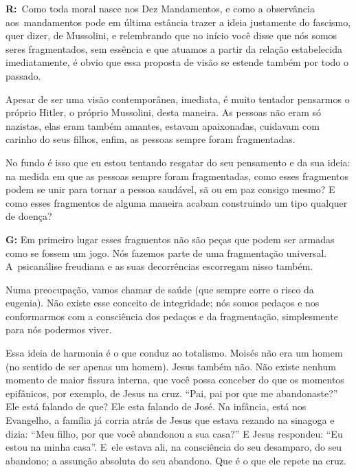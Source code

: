  

\textbf{R:}~Como toda moral nasce nos Dez Mandamentos, e como a
observância aos\textbf{}~mandamentos pode em última estância trazer a
ideia justamente do fascismo, quer dizer, de Mussolini, e relembrando
que no início você disse que nós somos seres fragmentados, sem essência
e que atuamos a partir da relação estabelecida imediatamente, é obvio
que essa proposta de visão se estende também por todo o passado.

 

Apesar de ser uma visão contemporânea, imediata, é muito tentador
pensarmos o próprio Hitler, o próprio Mussolini, desta maneira. As
pessoas não eram só nazistas, elas eram também amantes, estavam
apaixonadas, cuidavam com carinho do seus filhos, enfim, as pessoas
sempre foram fragmentadas.

 

No fundo é isso que eu estou tentando resgatar do seu pensamento e da
sua ideia: na medida em que as pessoas sempre foram fragmentadas, como
esses fragmentos podem se unir para tornar a pessoa saudável, sã ou em
paz consigo mesmo? E como esses fragmentos de alguma maneira acabam
construindo um tipo qualquer de doença?

 

\textbf{G:} Em primeiro lugar esses fragmentos não são peças que podem
ser armadas como se fossem um jogo. Nós fazemos parte de uma
fragmentação universal. A~psicanálise freudiana e as suas decorrências
escorregam nisso também.

 

Numa preocupação, vamos chamar de saúde (que sempre corre o risco da
eugenia). Não existe esse conceito de integridade; nós somos pedaços e
nos conformarmos com a consciência dos pedaços e da fragmentação,
simplesmente para nós podermos viver.

 

Essa ideia de harmonia é o que conduz ao totalismo. Moisés não era um
homem (no sentido de ser apenas um homem). Jesus também não. Não existe
nenhum momento de maior fissura interna, que você possa conceber do que
os momentos epifânicos, por exemplo, de Jesus na cruz. ``Pai, pai por
que me abandonaste?'' Ele está falando de que? Ele esta falando de José.
Na infância, está nos Evangelho, a família já corria atrás de Jesus que
estava rezando na sinagoga e dizia: ``Meu filho, por que você abandonou
a sua casa?'' E Jesus respondeu: ``Eu estou na minha casa''. E~ele
estava ali, na consciência do seu desamparo, do seu abandono; a assunção
absoluta do seu abandono. Que é o que ele repete na cruz.

